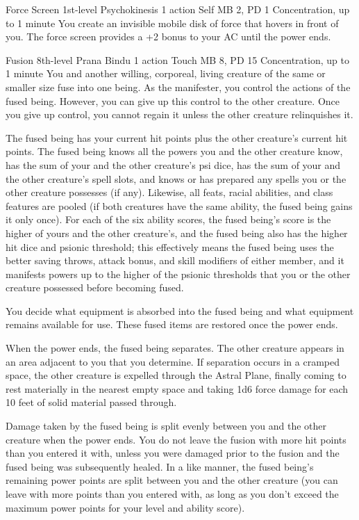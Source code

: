 \DndPowerHeader%
  {Force Screen}
  {1st-level Psychokinesis}
  {1 action}
  {Self}
  {MB 2, PD 1}
  {Concentration, up to 1 minute}
You create an invisible mobile disk of force that hovers in front of you.
The force screen provides a +2 bonus to your AC until the power ends.

\DndPowerHeader%
  {Fusion}
  {8th-level Prana Bindu}
  {1 action}
  {Touch}
  {MB 8, PD 15}
  {Concentration, up to 1 minute}
  You and another willing, corporeal, living creature
  of the same or smaller size fuse into one being.
  As the manifester,
  you control the actions of the fused being.
  However, you can give up this control to the other creature.
  Once you give up control,
  you cannot regain it unless the other creature relinquishes it.

  The fused being has your current hit points
  plus the other creature's current hit points.
  The fused being knows all the powers you
  and the other creature know,
  has the sum of your and the other creature's psi dice,
  has the sum of your and the other creature's spell slots,
  and knows or has prepared any spells you or the other creature possesses
  (if any).
  Likewise, all feats, racial abilities, and class features
  are pooled
  (if both creatures have the same ability,
  the fused being gains it only once).
  For each of the six ability scores,
  the fused being's score is the higher of yours
  and the other creature's,
  and the fused being also has the higher hit dice
  and psionic threshold;
  this effectively means the fused being uses
  the better saving throws,
  attack bonus,
  and skill modifiers of either member,
  and it manifests powers up to the higher of the psionic thresholds
  that you or the other creature possessed before becoming fused.
  
  You decide what equipment is absorbed into the fused being
  and what equipment remains available for use.
  These fused items are restored once the power ends.
  
  When the power ends,
  the fused being separates.
  The other creature appears in an area adjacent to you that you determine.
  If separation occurs in a cramped space,
  the other creature is expelled through the Astral Plane,
  finally coming to rest materially in the nearest empty space
  and taking 1d6 force damage
  for each 10 feet of solid material passed through.
  
  Damage taken by the fused being is split evenly
  between you and the other creature when the power ends.
  You do not leave the fusion with more hit points
  than you entered it with,
  unless you were damaged prior to the fusion
  and the fused being was subsequently healed.
  In a like manner,
  the fused being's remaining power points are split
  between you and the other creature
  (you can leave with more points than you entered with,
  as long as you don't exceed the maximum power points
  for your level and ability score).
  
